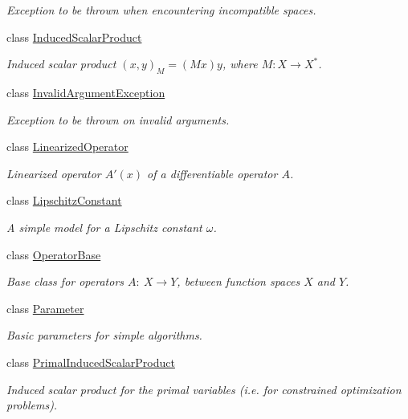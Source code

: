 \begin{DoxyCompactItemize}
\begin{DoxyCompactList}\small\item\em Exception to be thrown when encountering incompatible spaces. \end{DoxyCompactList}\item 
class \hyperlink{classSpacy_1_1InducedScalarProduct}{Induced\+Scalar\+Product}
\begin{DoxyCompactList}\small\item\em Induced scalar product $(x,y)_M = (Mx)y$, where $M:X\rightarrow X^*$. \end{DoxyCompactList}\item 
class \hyperlink{classSpacy_1_1InvalidArgumentException}{Invalid\+Argument\+Exception}
\begin{DoxyCompactList}\small\item\em Exception to be thrown on invalid arguments. \end{DoxyCompactList}\item 
class \hyperlink{classSpacy_1_1LinearizedOperator}{Linearized\+Operator}
\begin{DoxyCompactList}\small\item\em Linearized operator $A'(x)$ of a differentiable operator $A$. \end{DoxyCompactList}\item 
class \hyperlink{classSpacy_1_1LipschitzConstant}{Lipschitz\+Constant}
\begin{DoxyCompactList}\small\item\em A simple model for a Lipschitz constant $\omega$. \end{DoxyCompactList}\item 
class \hyperlink{classSpacy_1_1OperatorBase}{Operator\+Base}
\begin{DoxyCompactList}\small\item\em Base class for operators $A:\ X\rightarrow Y$, between function spaces $X$ and $Y$. \end{DoxyCompactList}\item 
class \hyperlink{classSpacy_1_1Parameter}{Parameter}
\begin{DoxyCompactList}\small\item\em Basic parameters for simple algorithms. \end{DoxyCompactList}\item 
class \hyperlink{classSpacy_1_1PrimalInducedScalarProduct}{Primal\+Induced\+Scalar\+Product}
\begin{DoxyCompactList}\small\item\em Induced scalar product for the primal variables (i.\+e. for constrained optimization problems). \end{DoxyCompactList}\item 

\end{DoxyCompactItemize}
